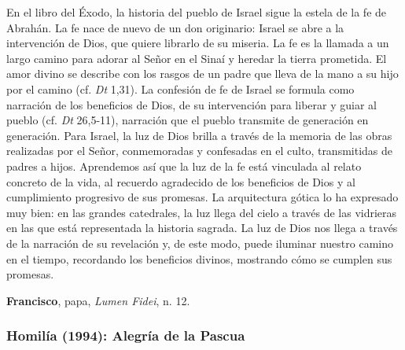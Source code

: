\begin{patercite}
En el libro del Éxodo, la historia del pueblo de Israel sigue la estela de la fe de Abrahán. La fe nace de nuevo de un don originario: Israel se abre a la intervención de Dios, que quiere librarlo de su miseria. La fe es la llamada a un largo camino para adorar al Señor en el Sinaí y heredar la tierra prometida. El amor divino se describe con los rasgos de un padre que lleva de la mano a su hijo por el camino (cf. \textit{Dt} 1,31). La confesión de fe de Israel se formula como narración de los beneficios de Dios, de su intervención para liberar y guiar al pueblo (cf. \textit{Dt} 26,5-11), narración que el pueblo transmite de generación en generación. Para Israel, la luz de Dios brilla a través de la memoria de las obras realizadas por el Señor, conmemoradas y confesadas en el culto, transmitidas de padres a hijos. Aprendemos así que la luz de la fe está vinculada al relato concreto de la vida, al recuerdo agradecido de los beneficios de Dios y al cumplimiento progresivo de sus promesas. La arquitectura gótica lo ha expresado muy bien: en las grandes catedrales, la luz llega del cielo a través de las vidrieras en las que está representada la historia sagrada. La luz de Dios nos llega a través de la narración de su revelación y, de este modo, puede iluminar nuestro camino en el tiempo, recordando los beneficios divinos, mostrando cómo se cumplen sus promesas.
	
	\textbf{Francisco}, papa, \textit{Lumen Fidei}, n. 12.
\end{patercite}

\newpage 

\subsubsection{Homilía (1994): Alegría de la Pascua}


